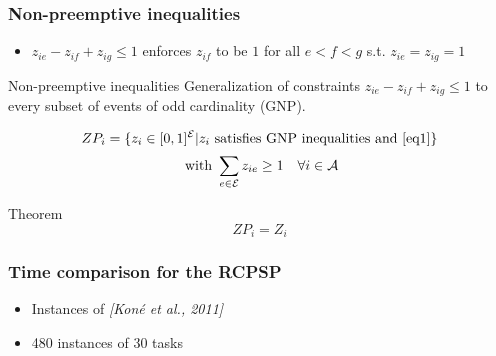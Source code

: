 \documentclass{beamer}
\begin{document}
\begin{frame}
  \frametitle{Non-preemptive inequalities}

  \begin{itemize}
  \item $ z_{ie}-z_{if}+z_{ig} \le 1$ enforces
    $z_{if}$ to be $1$ for all $e<f<g$ s.t. $z_{ie}=z_{ig}=1$ 
  \end{itemize}
  \pause
  \vspace{0.4cm}
  \begin{block}{Non-preemptive inequalities }
    Generalization of constraints $ z_{ie}-z_{if}+z_{ig} \le 1$ to
    every subset of events of odd cardinality (GNP).
  \end{block}
  \pause
  \vspace{0.4cm}
  \[ZP_i=\{ z_i \in [0,1]^{\cal E} | z_i\text{ satisfies
      GNP inequalities and } \eqref{eq1}\}\] 
  \begin{equation}
    \text{ with }  \sum_{e \in \cal E} z_{ie} \ge 1 \quad \forall i \in \cal A  
    \label{eq1}  
  \end{equation}
  \pause
  \vspace{0.4cm}
  \begin{block}{Theorem}
    \[ZP_i=Z_i\]
  \end{block}
  \vspace{0.5cm}
\end{frame}

\addtocounter{framenumber}{-1}


\mydat
\begin{frame}
  \frametitle{Time comparison for the RCPSP}
  \begin{itemize}
  \item Instances of {\color{gray!50!black!70} \it [Koné et al., 2011]}
  \item 480 instances of 30 tasks
  \end{itemize}

  \vspace{0.3cm}
  \begin{center}
  \end{center}
\end{frame}

\addtocounter{framenumber}{-1}
\end{document}
